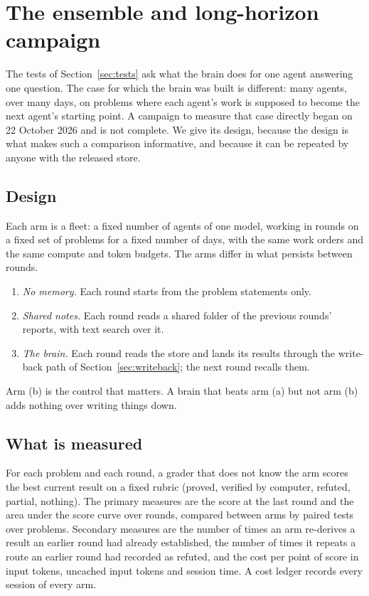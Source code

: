 \section{The ensemble and long-horizon campaign}\label{sec:campaign}

The tests of Section~\ref{sec:tests} ask what the brain does for one agent answering one question. The case for which the brain was built is different: many agents, over many days, on problems where each agent's work is supposed to become the next agent's starting point. A campaign to measure that case directly began on 22 October 2026 and is not complete. We give its design, because the design is what makes such a comparison informative, and because it can be repeated by anyone with the released store.

\subsection{Design}
Each arm is a fleet: a fixed number of agents of one model, working in rounds on a fixed set of problems for a fixed number of days, with the same work orders and the same compute and token budgets. The arms differ in what persists between rounds.
\begin{enumerate}[label=(\alph*)]
\item \emph{No memory.} Each round starts from the problem statements only.
\item \emph{Shared notes.} Each round reads a shared folder of the previous rounds' reports, with text search over it.
\item \emph{The brain.} Each round reads the store and lands its results through the write-back path of Section~\ref{sec:writeback}; the next round recalls them.
\end{enumerate}
Arm (b) is the control that matters. A brain that beats arm (a) but not arm (b) adds nothing over writing things down.

\subsection{What is measured}
For each problem and each round, a grader that does not know the arm scores the best current result on a fixed rubric (proved, verified by computer, refuted, partial, nothing). The primary measures are the score at the last round and the area under the score curve over rounds, compared between arms by paired tests over problems. Secondary measures are the number of times an arm re-derives a result an earlier round had already established, the number of times it repeats a route an earlier round had recorded as refuted, and the cost per point of score in input tokens, uncached input tokens and session time. A cost ledger records every session of every arm.

